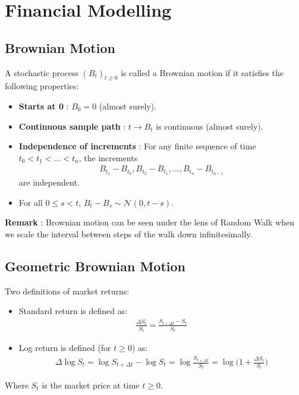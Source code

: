 \section{Financial Modelling}

\subsection{Brownian Motion}
\begin{definition}
    A stochastic process $(B_t)_{t\ge0}$ is called a Brownian motion if it satisfies the following properties:
    \begin{itemize}
        \item \textbf{Starts at 0} : $B_0 = 0$ (almost surely).
        \item \textbf{Continuous sample path} : $t\to B_t$ is continuous (almost surely).
        \item \textbf{Independence of increments} : For any finite sequence of time $t_0<t_1<\dots<t_n$, the increments
        \begin{align*}
            B_{t_1} - B_{t_0}, B_{t_2} - B_{t_1}, \dots, B_{t_n} - B_{t_{n-1}}
        \end{align*}
        are independent.
        \item For all $0\le s < t$, $B_t - B_s \sim \mathcal{N}(0, t-s)$.
    \end{itemize}
\end{definition}

\noindent\newline \textbf{Remark} : Brownian motion can be seen under the lens of Random Walk when we scale the interval between steps of the walk down infinitesimally.

\subsection{Geometric Brownian Motion}
\begin{definition} 
    Two definitions of market returns:
    \begin{itemize}
        \item Standard return is defined as:
        \begin{align*}
            \frac{\Delta S_t}{S_t} = \frac{S_{t+\Delta t} - S_t}{S_t}
        \end{align*}

        \item Log return is defined (for $t\ge 0$) as:
        \begin{align*}
            \Delta \log S_t = \log S_{t+\Delta t} - \log S_t = \log\frac{S_{t+\Delta t}}{S_t} = \log\Bigg( 1 + \frac{\Delta S_t}{S_t}\Bigg)
        \end{align*}
    \end{itemize}

    \noindent Where $S_t$ is the market price at time $t\ge0$.
\end{definition}

